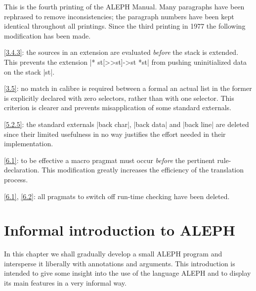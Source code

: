 \documentclass{article}
\newcommand\g[1]{{\sf #1}}
\let\oref\ref
\let\ref\oref
\newcommand\A{{\sf ALEPH}}
\begin{document}
\medskip

This is the fourth printing of the \A{} Manual. Many paragraphs have been
rephrased to remove inconsistencies; the paragraph numbers have been kept
identical throughout all printings. Since the third printing in 1977 the
following modification has been made.

\ref{3.4.3}: the \g{source}s in an \g{extension} are evaluated
\textit{before} the stack is extended. This prevents the \g{extension}
\pp|* st[>>st]->st *st| from pushing uninitialized data on the stack \pp|st|.

\ref{3.5}: no match in calibre is required between a formal an actual list in
the former is explicitly declared with zero selectors, rather than with one
selector. This criterion is clearer and prevents misapplication of some
standard externals.

\ref{5.2.5}: the standard externals \pp|back char|, \pp|back data| and
\pp|back line| are deleted since their limited usefulness in no way
justifies the effort needed in their implementation.

\ref{6.1}: to be effective a \g{macro} pragmat must occur \emph{before} the
pertinent \g{rule-declaration}. This modification greatly increases the
efficiency of the translation process.

\ref{6.1}, \ref{6.2}: all pragmats to switch off run-time checking have been
deleted.

%
%


\newpage
\setcounter{tocdepth}{3}
\tableofcontents

\newpage
\section{Informal introduction to \A}\label{1}

In this chapter we shall gradually develop a small \A{} program and
intersperse it liberally with annotations and arguments. This introduction
is intended to give some insight into the use of the language \A{} and to
display its main features in a very informal way.
\end{document}
